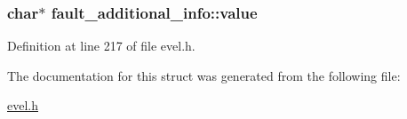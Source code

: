 \hypertarget{structfault__additional__info_aed1daed022cd49c694feccc8635236c4}{}
\subsubsection[{value}]{\setlength{\rightskip}{0pt plus 5cm}char$\ast$ fault\+\_\+additional\+\_\+info\+::value}\label{structfault__additional__info_aed1daed022cd49c694feccc8635236c4}


Definition at line 217 of file evel.\+h.



The documentation for this struct was generated from the following file\+:\begin{DoxyCompactItemize}
\item 
\hyperlink{evel_8h}{evel.\+h}\end{DoxyCompactItemize}
